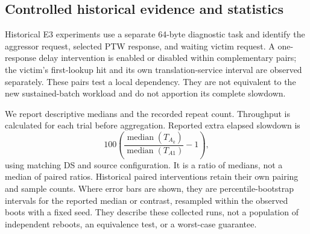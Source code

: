 \subsection{Controlled historical evidence and statistics}
Historical E3 experiments use a separate 64-byte diagnostic task and identify the aggressor request, selected PTW response, and waiting victim request. A one-response delay intervention is enabled or disabled within complementary pairs; the victim's first-lookup hit and its own translation-service interval are observed separately. These pairs test a local dependency. They are not equivalent to the new sustained-batch workload and do not apportion its complete slowdown.

We report descriptive medians and the recorded repeat count. Throughput is calculated for each trial before aggregation. Reported extra elapsed slowdown is
\begin{equation}
  100\left(\frac{\operatorname{median}(T_{A_k})}{\operatorname{median}(T_{A1})}-1\right),
\end{equation}
using matching DS and source configuration. It is a ratio of medians, not a median of paired ratios. Historical paired interventions retain their own pairing and sample counts. Where error bars are shown, they are percentile-bootstrap intervals for the reported median or contrast, resampled within the observed boots with a fixed seed. They describe these collected runs, not a population of independent reboots, an equivalence test, or a worst-case guarantee.
